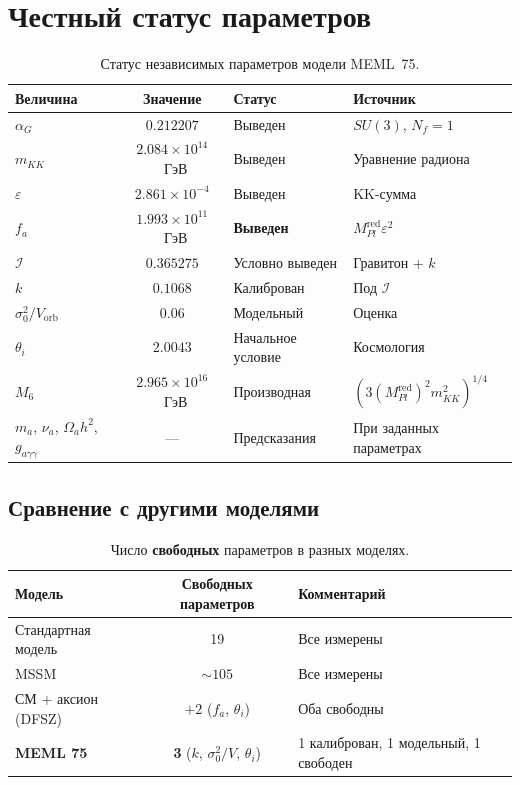 \documentclass[12pt,a4paper]{article}
\numberwithin{equation}{section}
\begin{document}
\section{Честный статус параметров}

\begin{table}[h!]
\centering
\caption{Статус независимых параметров модели MEML~75.}
\begin{tabular}{|l|c|l|l|}
\hline
Величина & Значение & Статус & Источник \\
\hline
$\alpha_G$ & $0.212207$ & Выведен & $SU(3)$, $N_f=1$ \\
$m_{KK}$ & $2.084\times 10^{14}$~ГэВ & Выведен & Уравнение радиона \\
$\varepsilon$ & $2.861\times 10^{-4}$ & Выведен & KK-сумма \\
$f_a$ & $1.993\times 10^{11}$~ГэВ & \textbf{Выведен} & 
$M_{Pl}^{\text{red}}\varepsilon^2$ \\
$\mathcal{I}$ & $0.365275$ & Условно выведен & Гравитон + $k$ \\
$k$ & $0.1068$ & Калиброван & Под $\mathcal{I}$ \\
$\sigma_0^2/V_{\text{orb}}$ & $0.06$ & Модельный & Оценка \\
$\theta_i$ & $2.0043$ & Начальное условие & Космология \\
\hline
$M_6$ & $2.965\times 10^{16}$~ГэВ & Производная & 
$(3(M_{Pl}^{\text{red}})^2 m_{KK}^2)^{1/4}$ \\
$m_a$, $\nu_a$, $\Omega_a h^2$, $g_{a\gamma\gamma}$ & --- & Предсказания & 
При заданных параметрах \\
\hline
\end{tabular}
\end{table}

\subsection{Сравнение с другими моделями}
\begin{table}[h!]
\centering
\caption{Число \textbf{свободных} параметров в разных моделях.}
\begin{tabular}{|l|c|l|}
\hline
Модель & Свободных параметров & Комментарий \\
\hline
Стандартная модель & 19 & Все измерены \\
MSSM & $\sim 105$ & Все измерены \\
СМ + аксион (DFSZ) & $+2$ ($f_a$, $\theta_i$) & Оба свободны \\
\textbf{MEML 75} & \textbf{3} ($k$, $\sigma_0^2/V$, $\theta_i$) & 
1 калиброван, 1 модельный, 1 свободен \\
\hline
\end{tabular}
\end{table}
\end{document}
